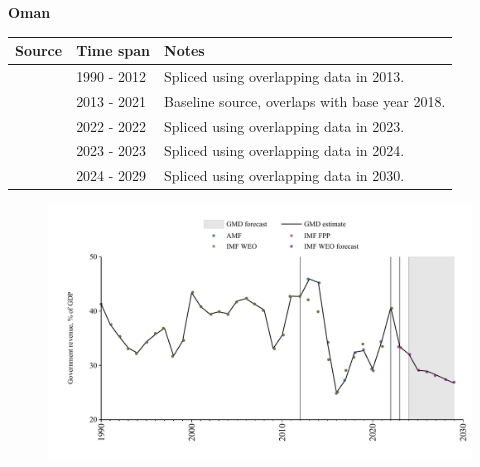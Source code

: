 \documentclass[12pt,a4paper,landscape]{article}
\begin{document}
\begin{adjustbox}{max totalsize={\paperwidth}{\paperheight},center}
\begin{minipage}[t][\textheight][t]{\textwidth}
\vspace*{0.5cm}
{}
\begin{center}
{\Large\bfseries Oman}
\end{center}
\vspace{0.5cm}
\begin{table}[H]
\centering
\small
\begin{tabular}{|l|l|l|}
\hline
\textbf{Source} & \textbf{Time span} & \textbf{Notes} \\
\hline
\rowcolor{white}\cite{IMF_WEO}& 1990 - 2012 &Spliced using overlapping data in 2013.\\
\rowcolor{lightgray}\cite{AMF}& 2013 - 2021 &Baseline source, overlaps with base year 2018.\\
\rowcolor{white}\cite{IMF_WEO}& 2022 - 2022 &Spliced using overlapping data in 2023.\\
\rowcolor{lightgray}\cite{IMF_FPP}& 2023 - 2023 &Spliced using overlapping data in 2024.\\
\rowcolor{white}\cite{IMF_WEO_forecast}& 2024 - 2029 &Spliced using overlapping data in 2030.\\
\hline
\end{tabular}
\end{table}
\begin{figure}[H]
\centering
\includegraphics[width=\textwidth,height=0.6\textheight,keepaspectratio]{graphs/OMN_govrev_GDP.pdf}
\end{figure}
\end{minipage}
\end{adjustbox}
\end{document}
